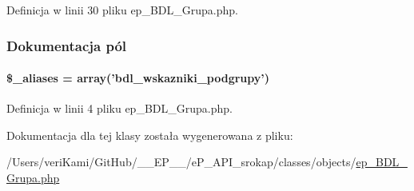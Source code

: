 Definicja w linii 30 pliku ep\-\_\-\-B\-D\-L\-\_\-\-Grupa.\-php.



\subsubsection{Dokumentacja pól}
\hypertarget{classep___b_d_l___podgrupa_ab4e31d75f0bc5d512456911e5d01366b}{
\paragraph[{\$\-\_\-aliases}]{\setlength{\rightskip}{0pt plus 5cm}\$\-\_\-aliases = array('bdl\-\_\-wskazniki\-\_\-podgrupy')}}\label{classep___b_d_l___podgrupa_ab4e31d75f0bc5d512456911e5d01366b}


Definicja w linii 4 pliku ep\-\_\-\-B\-D\-L\-\_\-\-Grupa.\-php.



Dokumentacja dla tej klasy została wygenerowana z pliku\-:\begin{DoxyCompactItemize}
\item 
/\-Users/veri\-Kami/\-Git\-Hub/\-\_\-\-\_\-\-E\-P\-\_\-\-\_\-/e\-P\-\_\-\-A\-P\-I\-\_\-srokap/classes/objects/\hyperlink{ep___b_d_l___grupa_8php}{ep\-\_\-\-B\-D\-L\-\_\-\-Grupa.\-php}\end{DoxyCompactItemize}
